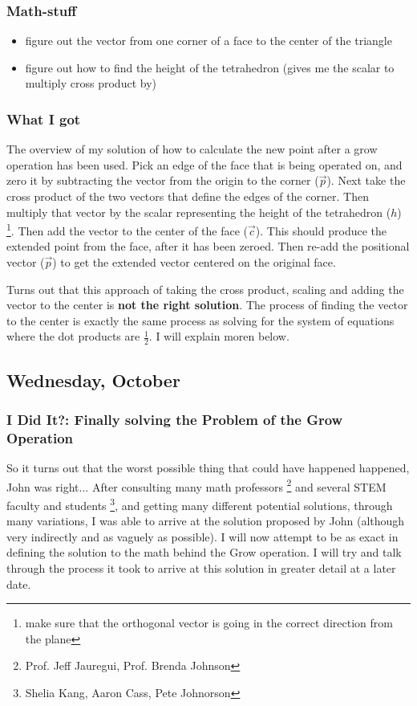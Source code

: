 \documentclass[letterpaper,oneside,titlepage]{article}
\begin{document}
\subsubsection*{Math-stuff}
\begin{itemize}
\item figure out the vector from one corner of a face to the center of the triangle
\item figure out how to find the height of the tetrahedron (gives me the scalar to multiply cross product by)
\end{itemize}
\subsubsection*{What I got}
The overview of my solution of how to calculate the new point after a grow operation has been used.  Pick an edge of the face that is being operated on, and zero it by subtracting the vector from the origin to the corner ($\overrightarrow{p}$).  Next take the cross product of the two vectors that define the edges of the corner. Then multiply that vector by the scalar representing the height of the tetrahedron ($h$) \footnote{make sure that the orthogonal vector is going in the correct direction from the plane}.  Then add the vector to the center of the face ($\overrightarrow{c}$).  This should produce the extended point from the face, after it has been zeroed.  Then re-add the positional vector ($\overrightarrow{p}$) to get the extended vector centered on the original face.
\par
Turns out that this approach of taking the cross product, scaling and adding the vector to the center is \textbf{not the right solution}.  The process of finding the vector to the center is exactly the same process as solving for the system of equations where the dot products are $\frac{1}{2}$.  I will explain moren below.

\subsection*{Wednesday, October}
\subsubsection*{I Did It?: Finally solving the Problem of the Grow Operation}
So it turns out that the worst possible thing that could have happened happened, John was right...  After consulting many math professors \footnote{Prof. Jeff Jauregui, Prof. Brenda Johnson} and several STEM faculty and students \footnote{Shelia Kang, Aaron Cass, Pete Johnorson}, and getting many different potential solutions, through many variations, I was able to arrive at the solution proposed by John (although very indirectly and as vaguely as possible).  I will now attempt to be as exact in defining the solution to the math behind the Grow operation.  I will try and talk through the process it took to arrive at this solution in greater detail at a later date.
\end{document}
